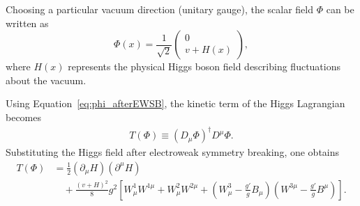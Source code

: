 Choosing a particular vacuum direction (unitary gauge), the scalar field 
$\Phi$ can be written as
\begin{equation}
\label{eq:phi_afterEWSB}
\Phi(x)
=
\frac{1}{\sqrt{2}}
\begin{pmatrix}
0 \\
v + H(x)
\end{pmatrix},
\end{equation}
where $H(x)$ represents the physical Higgs boson field describing 
fluctuations about the vacuum.

Using Equation~\eqref{eq:phi_afterEWSB}, the kinetic term of the Higgs Lagrangian becomes
\begin{align}
T(\Phi) \equiv (D_\mu \Phi)^\dagger D^\mu \Phi .
\end{align}
Substituting the Higgs field after electroweak symmetry breaking, one obtains
\begin{equation}
\begin{aligned}
T(\Phi)
&=
\frac{1}{2} (\partial_\mu H)(\partial^\mu H)  \\
&\quad
+ \frac{(v+H)^2}{8} g^2
\left[
W_\mu^1 W^{1\mu}
+ W_\mu^2 W^{2\mu}
+ \left(W_\mu^3 - \frac{g'}{g} B_\mu\right)
\left(W^{3\mu} - \frac{g'}{g} B^\mu\right)
\right].
\end{aligned}
\label{eq:KeHiggs0}
\end{equation}

